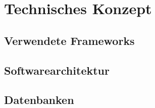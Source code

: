 \section{Technisches Konzept}

\subsection{Verwendete Frameworks}

\subsection{Softwarearchitektur}

\subsection{Datenbanken}